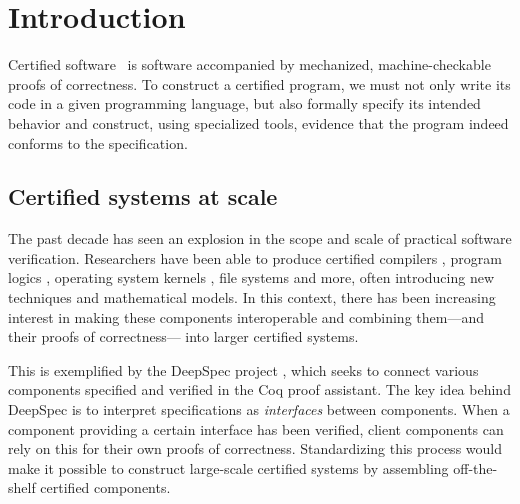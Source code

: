 \documentclass[draft,11pt]{report}
\begin{document}
\titlepage

\tableofcontents

\chapter{Introduction} %



Certified software~\cite{shao10}
is software accompanied by
mechanized, machine-checkable proofs of correctness.
To construct a certified program,
we must not only write its code in a given programming language,
but also formally specify its intended behavior
and construct, using specialized tools,
evidence that the program
indeed conforms to the specification.



\section{Certified systems at scale} %
\label{ssec:certsys}

The past decade has seen an explosion
in the scope and scale of practical software verification.
Researchers have been able to produce certified
compilers \cite{compcert},
program logics \cite{vst},
operating system kernels \cite{sel4,popl15},
file systems \cite{fscq} and more,
often introducing new techniques
and mathematical models.
In this context,
there has been increasing interest in
making these components
interoperable and
combining them---and their proofs of correctness---%
into larger certified systems.

This is exemplified by the DeepSpec project \cite{deepspec},
which seeks to connect various components
specified and verified in the Coq proof assistant.
The key idea behind DeepSpec
is to interpret specifications as \emph{interfaces}
between components.
When a component providing a certain interface
has been verified,
client components can rely on this
for their own proofs of correctness.
Standardizing this process would make it possible
to construct large-scale certified systems
by assembling off-the-shelf certified components.
\end{document}
